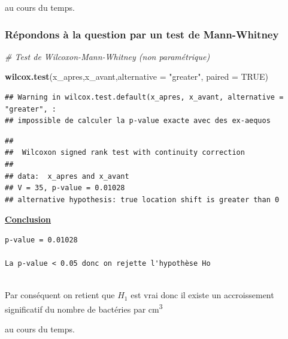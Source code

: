 \documentclass[
]{article}
\newenvironment{Shaded}{\begin{snugshade}}{\end{snugshade}}
\newcommand{\AttributeTok}[1]{\textcolor[rgb]{0.13,0.29,0.53}{#1}}
\newcommand{\CommentTok}[1]{\textcolor[rgb]{0.56,0.35,0.01}{\textit{#1}}}
\newcommand{\ConstantTok}[1]{\textcolor[rgb]{0.56,0.35,0.01}{#1}}
\newcommand{\FunctionTok}[1]{\textcolor[rgb]{0.13,0.29,0.53}{\textbf{#1}}}
\newcommand{\NormalTok}[1]{#1}
\newcommand{\StringTok}[1]{\textcolor[rgb]{0.31,0.60,0.02}{#1}}
\begin{document}
au cours du temps.

\subsubsection{Répondons à la question par un test de
Mann-Whitney}\label{ruxe9pondons-uxe0-la-question-par-un-test-de-mann-whitney}

\begin{Shaded}
\begin{Highlighting}[]
\CommentTok{\# Test de Wilcoxon{-}Mann{-}Whitney (non paramétrique) }


\FunctionTok{wilcox.test}\NormalTok{(x\_apres,x\_avant,}\AttributeTok{alternative =} \StringTok{"greater"}\NormalTok{, }\AttributeTok{paired =} \ConstantTok{TRUE}\NormalTok{) }
\end{Highlighting}
\end{Shaded}

\begin{verbatim}
## Warning in wilcox.test.default(x_apres, x_avant, alternative = "greater", :
## impossible de calculer la p-value exacte avec des ex-aequos
\end{verbatim}

\begin{verbatim}
## 
##  Wilcoxon signed rank test with continuity correction
## 
## data:  x_apres and x_avant
## V = 35, p-value = 0.01028
## alternative hypothesis: true location shift is greater than 0
\end{verbatim}

\ul{\textbf{Conclusion}}

\begin{verbatim}
p-value = 0.01028

La p-value < 0.05 donc on rejette l'hypothèse Ho 
 
\end{verbatim}

Par conséquent on retient que \(H_1\) est vrai donc il existe un
accroissement significatif du nombre de bactéries par
cm\textsuperscript{3}

au cours du temps.
\end{document}
